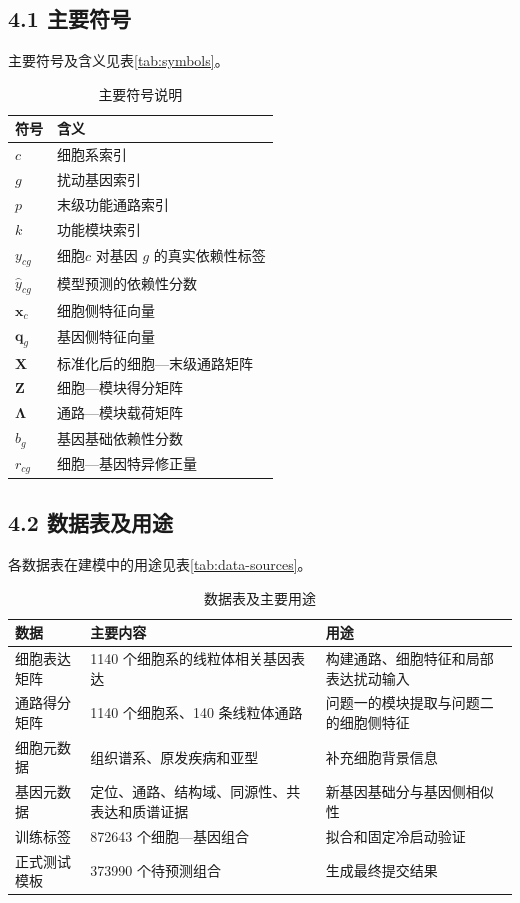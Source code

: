 \hypertarget{41-ux4e3bux8981ux7b26ux53f7}{%
\subsection{4.1 主要符号}\label{41-ux4e3bux8981ux7b26ux53f7}}

主要符号及含义见表\ref{tab:symbols}。

\begin{longtable}[]{@{}ll@{}}
\caption{主要符号说明}\\
\toprule
符号 & 含义 \\
\midrule
\endhead
\(c\) & 细胞系索引 \\
\(g\) & 扰动基因索引 \\
\(p\) & 末级功能通路索引 \\
\(k\) & 功能模块索引 \\
\(y_{cg}\) & 细胞\(c\) 对基因 \(g\) 的真实依赖性标签 \\
\(\widehat y_{cg}\) & 模型预测的依赖性分数 \\
\(\boldsymbol x_c\) & 细胞侧特征向量 \\
\(\boldsymbol q_g\) & 基因侧特征向量 \\
\(\boldsymbol X\) & 标准化后的细胞---末级通路矩阵 \\
\(\boldsymbol Z\) & 细胞---模块得分矩阵 \\
\(\boldsymbol\Lambda\) & 通路---模块载荷矩阵 \\
\(b_g\) & 基因基础依赖性分数 \\
\(r_{cg}\) & 细胞---基因特异修正量 \\
\bottomrule
\end{longtable}
\label{tab:symbols}

\hypertarget{42-ux6570ux636eux8868ux53caux7528ux9014}{%
\subsection{4.2 数据表及用途}\label{42-ux6570ux636eux8868ux53caux7528ux9014}}

各数据表在建模中的用途见表\ref{tab:data-sources}。

\begin{longtable}[]{@{}p{2.4cm}p{5.2cm}p{7.2cm}@{}}
\caption{数据表及主要用途}\\
\toprule
数据 & 主要内容 & 用途 \\
\midrule
\endhead
细胞表达矩阵 & 1140 个细胞系的线粒体相关基因表达 & 构建通路、细胞特征和局部表达扰动输入 \\
通路得分矩阵 & 1140 个细胞系、140 条线粒体通路 & 问题一的模块提取与问题二的细胞侧特征 \\
细胞元数据 & 组织谱系、原发疾病和亚型 & 补充细胞背景信息 \\
基因元数据 & 定位、通路、结构域、同源性、共表达和质谱证据 & 新基因基础分与基因侧相似性 \\
训练标签 & 872643 个细胞---基因组合 & 拟合和固定冷启动验证 \\
正式测试模板 & 373990 个待预测组合 & 生成最终提交结果 \\
\bottomrule
\end{longtable}
\label{tab:data-sources}

